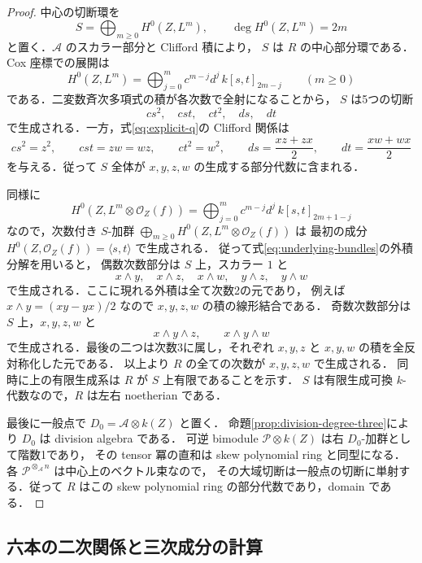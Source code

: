 \begin{proof}
中心の切断環を
\[
 S=\bigoplus_{m\ge0}H^0(Z,L^m),\qquad
 \deg H^0(Z,L^m)=2m
\]
と置く．$\mathcal A$ のスカラー部分と Clifford 積により，
$S$ は $R$ の中心部分環である．Cox 座標での展開は
\begin{equation}
 H^0(Z,L^m)
 =\bigoplus_{j=0}^m c^{m-j}d^j\,k[s,t]_{2m-j}
 \qquad(m\ge0)
 \label{eq:scroll-monomials}
\end{equation}
である．二変数斉次多項式の積が各次数で全射になることから，
$S$ は5つの切断
\[
 cs^2,\quad cst,\quad ct^2,\quad ds,\quad dt
\]
で生成される．一方，式\eqref{eq:explicit-q}の Clifford 関係は
\begin{equation}
 cs^2=z^2,\qquad cst=zw=wz,\qquad ct^2=w^2,
 \qquad ds=\frac{xz+zx}{2},\qquad dt=\frac{xw+wx}{2}
 \label{eq:scalar-generators}
\end{equation}
を与える．従って $S$ 全体が $x,y,z,w$ の生成する部分代数に含まれる．

同様に
\[
 H^0(Z,L^m\otimes\mathcal O_Z(f))
 =\bigoplus_{j=0}^m c^{m-j}d^j\,k[s,t]_{2m+1-j}
\]
なので，次数付き $S$-加群
$\bigoplus_{m\ge0}H^0(Z,L^m\otimes\mathcal O_Z(f))$ は
最初の成分 $H^0(Z,\mathcal O_Z(f))=\langle s,t\rangle$ で生成される．
従って式\eqref{eq:underlying-bundles}の外積分解を用いると，
偶数次数部分は $S$ 上，スカラー $1$ と
\[
 x\wedge y,\quad x\wedge z,\quad x\wedge w,\quad
 y\wedge z,\quad y\wedge w
\]
で生成される．ここに現れる外積は全て次数2の元であり，
例えば $x\wedge y=(xy-yx)/2$ なので
$x,y,z,w$ の積の線形結合である．
奇数次数部分は $S$ 上，$x,y,z,w$ と
\[
 x\wedge y\wedge z,\qquad x\wedge y\wedge w
\]
で生成される．最後の二つは次数3に属し，それぞれ
$x,y,z$ と $x,y,w$ の積を全反対称化した元である．
以上より $R$ の全ての次数が $x,y,z,w$ で生成される．
同時に上の有限生成系は $R$ が $S$ 上有限であることを示す．
$S$ は有限生成可換 $k$-代数なので，$R$ は左右 noetherian である．

最後に一般点で $D_0=\mathcal A\otimes k(Z)$ と置く．
命題\ref{prop:division-degree-three}により $D_0$ は division algebra である．
可逆 bimodule $\mathcal P\otimes k(Z)$ は右 $D_0$-加群として階数1であり，
その tensor 冪の直和は skew polynomial ring と同型になる．
各 $\mathcal P^{\otimes_{\mathcal A}n}$ は中心上のベクトル束なので，
その大域切断は一般点の切断に単射する．従って $R$ はこの
skew polynomial ring の部分代数であり，domain である．
\end{proof}

\subsection{六本の二次関係と三次成分の計算}

